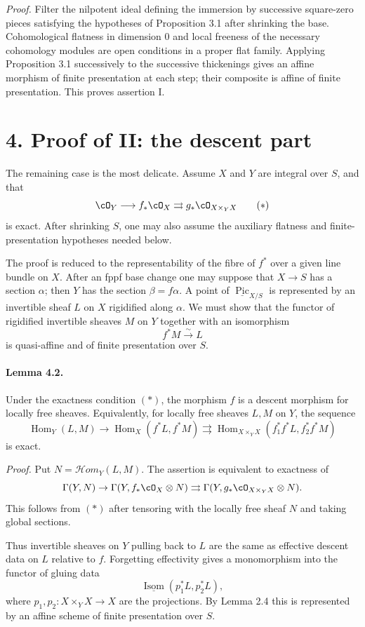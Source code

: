 \documentclass[11pt]{article}
\theoremstyle{plain}
\theoremstyle{definition}
\theoremstyle{remark}
\DeclareMathOperator{\Hom}{Hom}
\DeclareMathOperator{\Isom}{Isom}
\DeclareMathOperator{\Pic}{Pic}
\newcommand{\longto}{\longrightarrow}
\providecommand{\iso}{\xrightarrow{\sim}}
\begin{document}
\emph{Proof.}
Filter the nilpotent ideal defining the immersion by successive square-zero pieces satisfying the hypotheses of Proposition 3.1 after shrinking the base. Cohomological flatness in dimension $0$ and local freeness of the necessary cohomology modules are open conditions in a proper flat family. Applying Proposition 3.1 successively to the successive thickenings gives an affine morphism of finite presentation at each step; their composite is affine of finite presentation. This proves assertion I.

\section*{4. Proof of II: the descent part}

The remaining case is the most delicate. Assume $X$ and $Y$ are integral over $S$, and that
\[
\cO_Y\longto f_*\cO_X\rightrightarrows g_*\cO_{X\times_YX}
\tag{$*$}
\]
is exact. After shrinking $S$, one may also assume the auxiliary flatness and finite-presentation hypotheses needed below.

The proof is reduced to the representability of the fibre of $f^*$ over a given line bundle on $X$. After an fppf base change one may suppose that $X\to S$ has a section $\alpha$; then $Y$ has the section $\beta=f\alpha$. A point of $\underline{\Pic}_{X/S}$ is represented by an invertible sheaf $L$ on $X$ rigidified along $\alpha$. We must show that the functor of rigidified invertible sheaves $M$ on $Y$ together with an isomorphism
\[
f^*M\iso L
\]
is quasi-affine and of finite presentation over $S$.

\paragraph{Lemma 4.2.}
Under the exactness condition $(*)$, the morphism $f$ is a descent morphism for locally free sheaves. Equivalently, for locally free sheaves $L,M$ on $Y$, the sequence
\[
\Hom_Y(L,M)\to\Hom_X(f^*L,f^*M)
\rightrightarrows
\Hom_{X\times_YX}(f_1^*f^*L,f_2^*f^*M)
\]
is exact.

\emph{Proof.}
Put $N=\mathcal Hom_Y(L,M)$. The assertion is equivalent to exactness of
\[
\Gamma(Y,N)\to\Gamma(Y,f_*\cO_X\otimes N)
\rightrightarrows
\Gamma(Y,g_*\cO_{X\times_YX}\otimes N).
\]
This follows from $(*)$ after tensoring with the locally free sheaf $N$ and taking global sections.

Thus invertible sheaves on $Y$ pulling back to $L$ are the same as effective descent data on $L$ relative to $f$. Forgetting effectivity gives a monomorphism into the functor of gluing data
\[
\underline{\Isom}(p_1^*L,p_2^*L),
\]
where $p_1,p_2:X\times_YX\to X$ are the projections. By Lemma 2.4 this is represented by an affine scheme of finite presentation over $S$.
\end{document}
